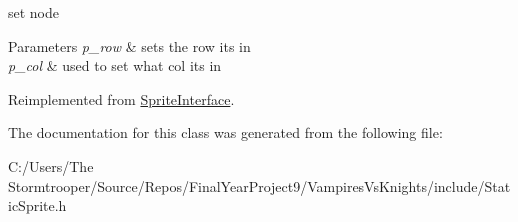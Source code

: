 set node 


\begin{DoxyParams}{Parameters}
{\em p\+\_\+row} & sets the row its in \\
\hline
{\em p\+\_\+col} & used to set what col its in \\
\hline
\end{DoxyParams}


Reimplemented from \mbox{\hyperlink{class_sprite_interface_aab826769df1222d5dd2ff426c8551bb2}{Sprite\+Interface}}.



The documentation for this class was generated from the following file\+:\begin{DoxyCompactItemize}
\item 
C\+:/\+Users/\+The Stormtrooper/\+Source/\+Repos/\+Final\+Year\+Project9/\+Vampires\+Vs\+Knights/include/Static\+Sprite.\+h\end{DoxyCompactItemize}
